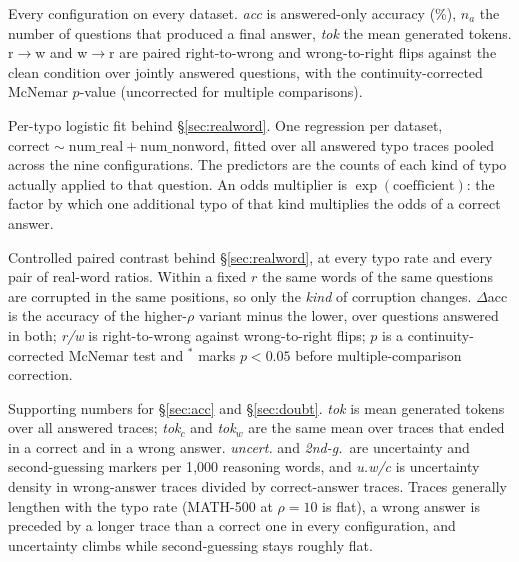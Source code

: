 \documentclass[11pt]{article}
\begin{document}
\begin{table}[H]
\centering
\scriptsize

\caption{Every configuration on every dataset. \emph{acc} is answered-only
accuracy (\%), $n_a$ the number of questions that produced a final answer,
\emph{tok} the mean generated tokens. r$\to$w and w$\to$r are paired
right-to-wrong and wrong-to-right flips against the clean condition over jointly
answered questions, with the continuity-corrected McNemar $p$-value
(uncorrected for multiple comparisons).}
\label{tab:grid}
\end{table}

\begin{table}[H]
\centering
\scriptsize

\caption{Per-typo logistic fit behind \S\ref{sec:realword}. One regression per
dataset, $\text{correct} \sim \text{num\_real} + \text{num\_nonword}$, fitted
over all answered typo traces pooled across the nine configurations. The
predictors are the counts of each kind of typo actually applied to that
question. An odds multiplier is $\exp(\text{coefficient})$: the factor by which
one additional typo of that kind multiplies the odds of a correct answer.}
\label{tab:realword-logit}
\end{table}

\begin{table}[H]
\centering
\scriptsize

\caption{Controlled paired contrast behind \S\ref{sec:realword}, at every typo
rate and every pair of real-word ratios. Within a fixed $r$ the same words of
the same questions are corrupted in the same positions, so only the \emph{kind}
of corruption changes. $\Delta$acc is the accuracy of the higher-$\rho$ variant
minus the lower, over questions answered in both; \emph{r/w} is right-to-wrong
against wrong-to-right flips; $p$ is a continuity-corrected McNemar test and
$^{*}$ marks $p<0.05$ before multiple-comparison correction.}
\label{tab:realword-paired}
\end{table}

\begin{table}[H]
\centering
\scriptsize

\caption{Supporting numbers for \S\ref{sec:acc} and \S\ref{sec:doubt}.
\emph{tok} is mean generated tokens over all answered traces; \emph{tok}$_{c}$
and \emph{tok}$_{w}$ are the same mean over traces that ended in a correct and
in a wrong answer. \emph{uncert.} and \emph{2nd-g.}\ are uncertainty and
second-guessing markers per 1{,}000 reasoning words, and \emph{u.w/c} is
uncertainty density in wrong-answer traces divided by correct-answer traces.
Traces generally lengthen with the typo rate (MATH-500 at $\rho{=}10$ is flat),
a wrong answer is preceded by a longer trace than a correct one in every
configuration, and uncertainty climbs while second-guessing stays roughly
flat.}
\label{tab:support}
\end{table}
\end{document}
